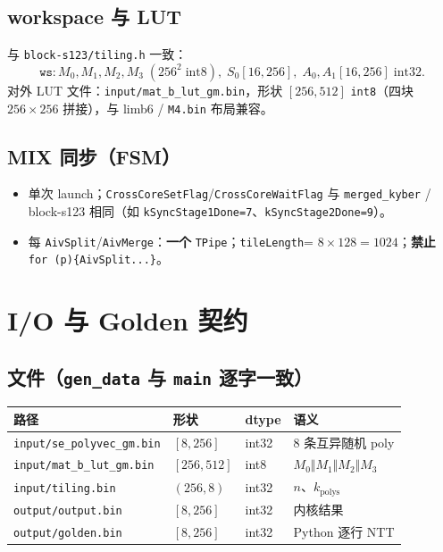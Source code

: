 \documentclass[UTF8,a4paper,11pt]{ctexart}
\begin{document}
\subsection{workspace 与 LUT}
与 \texttt{block-s123/tiling.h} 一致：
\[
  \texttt{ws}: M_0,M_1,M_2,M_3\;(256^2\;\text{int8}),\; S_0[16,256],\; A_0,A_1[16,256]\;\text{int32}.
\]
对外 LUT 文件：\texttt{input/mat\_b\_lut\_gm.bin}，形状 $[256,512]$ \texttt{int8}（四块 $256\times256$ 拼接），与 limb6 / \texttt{M4.bin} 布局兼容。

\subsection{MIX 同步（FSM）}
\begin{itemize}
  \item 单次 launch；\texttt{CrossCoreSetFlag}/\texttt{CrossCoreWaitFlag} 与 \texttt{merged\_kyber} / block-s123 相同（如 \texttt{kSyncStage1Done=7}、\texttt{kSyncStage2Done=9}）。
  \item 每 \texttt{AivSplit}/\texttt{AivMerge}：\textbf{一个} \texttt{TPipe}；\texttt{tileLength}= $8\times128=1024$；\textbf{禁止} \texttt{for (p)\{AivSplit...\}}。
\end{itemize}

\section{I/O 与 Golden 契约}

\subsection{文件（\texttt{gen\_data} 与 \texttt{main} 逐字一致）}
\begin{table}[h]
  \centering
  \begin{tabular}{@{}llll@{}}
    \toprule
    路径 & 形状 & dtype & 语义 \\
    \midrule
    \texttt{input/se\_polyvec\_gm.bin} & $[8,256]$ & int32 & 8 条互异随机 poly \\
    \texttt{input/mat\_b\_lut\_gm.bin} & $[256,512]$ & int8 & $M_0\Vert M_1\Vert M_2\Vert M_3$ \\
    \texttt{input/tiling.bin} & $(256,8)$ & int32 & $n$、$k_{\mathrm{polys}}$ \\
    \texttt{output/output.bin} & $[8,256]$ & int32 & 内核结果 \\
    \texttt{output/golden.bin} & $[8,256]$ & int32 & Python 逐行 NTT \\
    \bottomrule
  \end{tabular}
\end{table}
\end{document}
